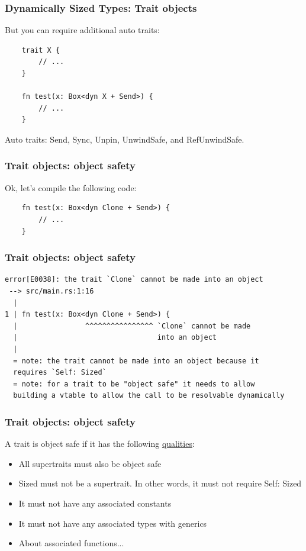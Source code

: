 \documentclass[aspectratio=1610,t]{beamer}
\begin{document}

\begin{frame}[fragile]
\frametitle{Dynamically Sized Types: Trait objects}
But you can require additional auto traits:

\begin{verbatim}
    trait X {
        // ...
    }

    fn test(x: Box<dyn X + Send>) {
        // ...
    }
\end{verbatim}
Auto traits: Send, Sync, Unpin, UnwindSafe, and RefUnwindSafe.
\end{frame}


\begin{frame}[fragile]
\frametitle{Trait objects: object safety}
Ok, let's compile the following code:

\begin{verbatim}
    fn test(x: Box<dyn Clone + Send>) {
        // ...
    }
\end{verbatim}
\end{frame}


\begin{frame}[fragile]
\frametitle{Trait objects: object safety}
\begin{verbatim}
error[E0038]: the trait `Clone` cannot be made into an object
 --> src/main.rs:1:16
  |
1 | fn test(x: Box<dyn Clone + Send>) {
  |                ^^^^^^^^^^^^^^^^ `Clone` cannot be made
  |                                 into an object
  |
  = note: the trait cannot be made into an object because it
  requires `Self: Sized`
  = note: for a trait to be "object safe" it needs to allow
  building a vtable to allow the call to be resolvable dynamically
\end{verbatim}
\end{frame}


\begin{frame}[fragile]
\frametitle{Trait objects: object safety}
A trait is object safe if it has the following \href{https://doc.rust-lang.org/reference/items/traits.html#object-safety}{qualities}:

\begin{itemize}
    \item All supertraits must also be object safe
    \item Sized must not be a supertrait. In other words, it must not require Self: Sized
    \item It must not have any associated constants
    \item It must not have any associated types with generics
    \item About associated functions...
\end{itemize}
\end{frame}
\end{document}
